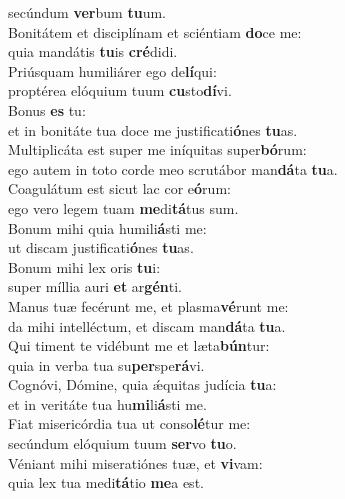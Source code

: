\oddverse secúndum \textbf{ver}bum \textbf{tu}um.\\
\evenverse Bonitátem et disciplínam et sciéntiam \textbf{do}ce me:~\*\\
\evenverse quia mandátis \textbf{tu}is \textbf{cré}didi.\\
\oddverse Priúsquam humiliárer ego de\textbf{lí}qui:~\*\\
\oddverse proptérea elóquium tuum \textbf{cu}sto\textbf{dí}vi.\\
\evenverse Bonus \textbf{es} tu:~\*\\
\evenverse et in bonitáte tua doce me justificati\textbf{ó}nes \textbf{tu}as.\\
\oddverse Multiplicáta est super me iníquitas super\textbf{bó}rum:~\*\\
\oddverse ego autem in toto corde meo scrutábor man\textbf{dá}ta \textbf{tu}a.\\
\evenverse Coagulátum est sicut lac cor e\textbf{ó}rum:~\*\\
\evenverse ego vero legem tuam \textbf{me}di\textbf{tá}tus sum.\\
\oddverse Bonum mihi quia humili\textbf{á}sti me:~\*\\
\oddverse ut discam justificati\textbf{ó}nes \textbf{tu}as.\\
\evenverse Bonum mihi lex oris \textbf{tu}i:~\*\\
\evenverse super míllia auri \textbf{et} ar\textbf{gén}ti.\\
\oddverse Manus tuæ fecérunt me, et plasma\textbf{vé}runt me:~\*\\
\oddverse da mihi intelléctum, et discam man\textbf{dá}ta \textbf{tu}a.\\
\evenverse Qui timent te vidébunt me et læta\textbf{bún}tur:~\*\\
\evenverse quia in verba tua su\textbf{per}spe\textbf{rá}vi.\\
\oddverse Cognóvi, Dómine, quia ǽquitas judícia \textbf{tu}a:~\*\\
\oddverse et in veritáte tua hu\textbf{mi}li\textbf{á}sti me.\\
\evenverse Fiat misericórdia tua ut conso\textbf{lé}tur me:~\*\\
\evenverse secúndum elóquium tuum \textbf{ser}vo \textbf{tu}o.\\
\oddverse Véniant mihi miseratiónes tuæ, et \textbf{vi}vam:~\*\\
\oddverse quia lex tua medi\textbf{tá}tio \textbf{me}a est.\\
